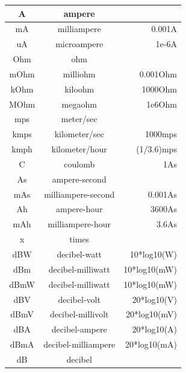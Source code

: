 \begin{longtable}{|c|c|r|}
  A & ampere & \\\hline
  mA & milliampere & 0.001A \\\hline
  uA & microampere & 1e-6A \\\hline
  Ohm & ohm & \\\hline
  mOhm & milliohm & 0.001Ohm \\\hline
  kOhm & kiloohm & 1000Ohm \\\hline
  MOhm & megaohm & 1e6Ohm \\\hline
  mps & meter/sec & \\\hline
  kmps & kilometer/sec & 1000mps \\\hline
  kmph & kilometer/hour & (1/3.6)mps \\\hline
  C & coulomb & 1As \\\hline
  As & ampere-second & \\\hline
  mAs & milliampere-second & 0.001As \\\hline
  Ah & ampere-hour & 3600As \\\hline
  mAh & milliampere-hour & 3.6As \\\hline
  x & times & \\\hline
  dBW & decibel-watt & 10*log10(W) \\\hline
  dBm & decibel-milliwatt & 10*log10(mW) \\\hline
  dBmW & decibel-milliwatt & 10*log10(mW) \\\hline
  dBV & decibel-volt & 20*log10(V) \\\hline
  dBmV & decibel-millivolt & 20*log10(mV) \\\hline
  dBA & decibel-ampere & 20*log10(A) \\\hline
  dBmA & decibel-milliampere & 20*log10(mA) \\\hline
  dB & decibel & \\\hline
\end{longtable}



